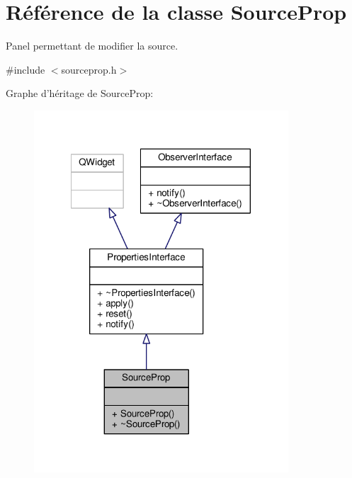 \hypertarget{classSourceProp}{\section{Référence de la classe Source\+Prop}
\label{classSourceProp}
}


Panel permettant de modifier la source.  




{\ttfamily \#include $<$sourceprop.\+h$>$}



Graphe d'héritage de Source\+Prop\+:\nopagebreak
\begin{figure}[H]
\begin{center}
\leavevmode
\includegraphics[width=269pt]{d6/da2/classSourceProp__inherit__graph}
\end{center}
\end{figure}


